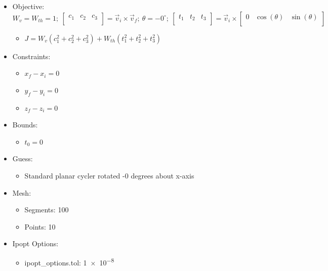 \documentclass{article}
\begin{document}
\begin{itemize}
    \item Objective: $W_v = W_{th} = 1;\ \left[\begin{matrix}c_1&c_2&c_3\\\end{matrix}\right] = \vec{v}_i\times\vec{v}_f;\ \theta=-0^\circ;\ \left[\begin{matrix}t_1&t_2&t_3\\\end{matrix}\right] = \vec{v}_i\times\left[\begin{matrix}0&\cos\left(\theta\right)&\sin\left(\theta\right)\\\end{matrix}\right]$
    \begin{itemize}
        \item $J = W_v\left(c_1^2 + c_2^2 + c_3^2\right) + W_{th}\left(t_1^2 + t_2^2 + t_3^2\right)$
    \end{itemize}
    \item Constraints:
    \begin{itemize}
        \item $x_f - x_i = 0$
        \item $y_f - y_i = 0$
        \item $z_f - z_i = 0$
    \end{itemize}
    \item Bounds:
    \begin{itemize}
        \item $t_0 = 0$
    \end{itemize}
    \item Guess:
    \begin{itemize}
        \item Standard planar cycler rotated -0 degrees about x-axis
    \end{itemize}
    \item Mesh:
    \begin{itemize}
        \item Segments: 100
        \item Points: 10
    \end{itemize}
    \item Ipopt Options:
    \begin{itemize}
        \item ipopt\_options.tol: \num{1e-8}
    \end{itemize}
\end{itemize}
\end{document}

